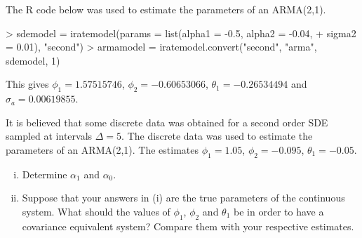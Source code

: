 \documentclass{article}
\numberwithin{questioncounter}{section}
\begin{document}
\begin{solution}
The R code below was used to estimate the parameters of an ARMA(2,1).

\begin{Schunk}
\begin{Sinput}
> sdemodel = iratemodel(params = list(alpha1 = -0.5, alpha2 = -0.04,
+ 	sigma2 = 0.01), "second")
> armamodel = iratemodel.convert("second", "arma", sdemodel, 1)
\end{Sinput}
\end{Schunk}


This gives $\phi_{1} = 1.57515746$, $\phi_{2} = -0.60653066$, $\theta_{1} = -0.26534494$ and $\sigma_{a} =0.00619855$.


\end{solution}

\begin{question}
It is believed that some discrete data was obtained for a second order SDE sampled at intervals $\Delta = 5$. The discrete data was used to estimate the parameters of an ARMA(2,1). The estimates $\phi_{1} = 1.05$, $\phi_{2} = -0.095$, $\theta_{1} = -0.05$.

\begin{enumerate}[(i)]
\item Determine $\alpha_{1}$ and $\alpha_{0}$.
\item Suppose that your answers in (i) are the true parameters of the continuous system. What should the values of $\phi_{1}$, $\phi_{2}$ and $\theta_{1}$ be in order to have a covariance equivalent system? Compare them with your respective estimates.
\end{enumerate}

\end{question}
\end{document}
